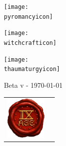 \begin{titlepage}
\begin{center}
\begin{minipage}[c]{\minipagewidth}
\begin{center}
\texttt{[image: \\pyromancyicon]}

\vspace*{\spacebetweeniconrows}

\texttt{[image: \\witchcrafticon]}

\vspace*{\spacebetweeniconrows}

\texttt{[image: \\thaumaturgyicon]}
\end{center}
\end{minipage}\hspace*{\fill}


\vspace*{0.7cm}

{\titlefont\fontsize{50}{60}\selectfont \booktitle
\vspace{0.4cm}

\fontsize{14}{16.8}\selectfont Beta v\version{} - \today{}}

\vfill

\begin{tabular}{@{}m{2cm}@{\hskip 20pt}m{13cm}@{}}
\includegraphics[width=2cm]{../Layout/pics/seal_9th.png} &
{\fontsize{10}{12}\selectfont \textcolor{black!50}{\noindent{}}}

\ifdef{\frontpageaddstuff}{{\fontsize{10}{12}\selectfont \noindent\textcolor{black!50}{\frontpageaddstuff}}}{}

\vspace*{10pt}
\noindent{\fontsize{10}{12}\selectfont \textcolor{black!50}{\labels@license}}
\tabularnewline
\end{tabular}


\end{center}

\newpage

\thispagestyle{empty}

{\fontsize{10}{12}\selectfont

\begin{center}\hypertarget{tableofcontents}{}\end{center}

}
\end{titlepage}
